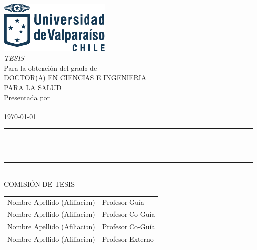 
\begin{titlepage}
    \rmfamily\large %
    \centering 
    \includegraphics[width=5.4cm,keepaspectratio]{elements/logos/logoUVazul.eps}\\
    \vspace{2\baselineskip}
    \textit{\uppercase{Tesis}} \\ [2ex]
    Para la obtención del grado de \\ [2ex]
    \uppercase{Doctor(a) en Ciencias e Ingenieria \\ Para la Salud} \\ [2ex]
    Presentada por \\ [1.5ex]
    \uppercase{\TesisAuthor} \\ [2ex]
    \today \\
    \vspace{1\baselineskip}
    \rule{0.35\textwidth}{0.5pt} \\
    \vspace{1\baselineskip}
    {%
    \rmfamily\Large\bfseries %
    \TesisTitle
    }\\
    \vspace{1\baselineskip}
    \rule{0.35\textwidth}{0.5pt}
    \vspace{3\baselineskip} \\
    \uppercase{Comisión de Tesis} \\ [2ex] 
    \begin{tabular}{l@{\hskip 2cm}l}
        Nombre Apellido (Afiliacion) & Profesor Guía \\[10pt]
        Nombre Apellido (Afiliacion) & Profesor Co-Guía \\ [10pt]
        Nombre Apellido (Afiliacion) & Profesor Co-Guía \\ [10pt]
        Nombre Apellido (Afiliacion) & Profesor Externo \\ [10pt]
    \end{tabular}
    \vfill
\end{titlepage}